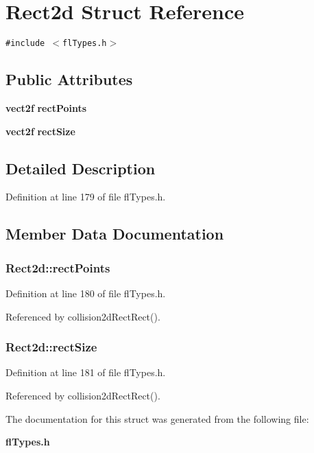 \section{Rect2d Struct Reference}
\label{structRect2d}
{\tt \#include $<$fl\-Types.h$>$}

\subsection*{Public Attributes}
\begin{CompactItemize}
\item 
{\bf vect2f} {\bf rect\-Points}
\item 
{\bf vect2f} {\bf rect\-Size}
\end{CompactItemize}


\subsection{Detailed Description}




Definition at line 179 of file fl\-Types.h.

\subsection{Member Data Documentation}
\subsubsection{ {\bf Rect2d::rect\-Points}}\label{structRect2d_96a61f480c56d6459d13f0a3e9371001}




Definition at line 180 of file fl\-Types.h.

Referenced by collision2d\-Rect\-Rect().
\subsubsection{ {\bf Rect2d::rect\-Size}}\label{structRect2d_f8a0ee865286b5b2836994015d1f8b7e}




Definition at line 181 of file fl\-Types.h.

Referenced by collision2d\-Rect\-Rect().

The documentation for this struct was generated from the following file:\begin{CompactItemize}
\item 
{\bf fl\-Types.h}\end{CompactItemize}
